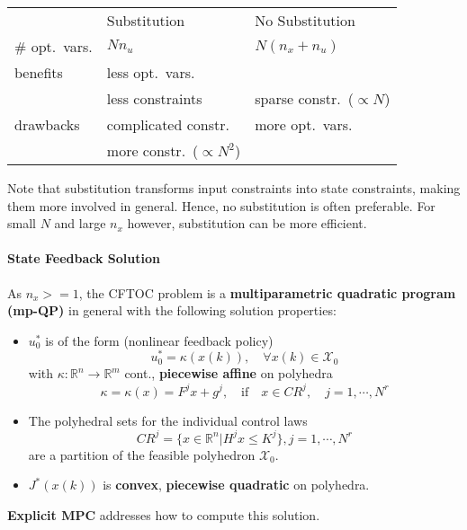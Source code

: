 \renewcommand{\arraystretch}{1.3}
\setlength{\oldtabcolsep}{\tabcolsep}\setlength\tabcolsep{6pt}
\begin{tabularx}{\linewidth}{@{}lll@{}}
                   & Substitution                  & No Substitution               \\
    \cmidrule{2-3}
    \# opt.\ vars. & $N n_u$                       & $N(n_x + n_u)$                \\
    benefits       & less opt.\ vars.              &                               \\
                   & less constraints              & sparse constr.\ ($\propto N$) \\
    drawbacks      & complicated constr.           & more opt.\ vars.              \\
                   & more constr.\ ($\propto N^2$) &                               %
\end{tabularx}
\renewcommand{\arraystretch}{1}
\setlength\tabcolsep{\oldtabcolsep}
Note that substitution transforms input constraints into state constraints, making them more involved in general. Hence, no substitution is often preferable. For small $N$ and large $n_x$ however, substitution can be more efficient.

\paragraph{State Feedback Solution}

As $n_x>=1$, the CFTOC problem is a \textbf{multiparametric quadratic program (mp-QP)} in general with the following solution properties:

\begin{itemize}
    \item $u_0^*$ is of the form (nonlinear feedback policy)
          \begin{equation*}
              u_0^*=\kappa(x(k)),\quad\forall x(k)\in\mathcal{X}_0
          \end{equation*}
          with $\kappa:\mathbb{R}^n \to \mathbb{R}^m$ cont., \textbf{piecewise affine} on polyhedra
          \begin{equation*}
              \kappa  =\kappa(x)=F^j x + g^j, \quad\mathrm{if}\quad x\in CR^j,\quad j=1,\cdots,N^r
          \end{equation*}
    \item The polyhedral sets for the individual control laws
          \begin{equation*}
              CR^j=\{x\in\mathbb{R}^n|H^j x\leq K^j\},j=1,\cdots,N^r
          \end{equation*}
          are a partition of the feasible polyhedron $\mathcal{X}_0$.
    \item $J^*(x(k))$ is \textbf{convex}, \textbf{piecewise quadratic} on polyhedra.
\end{itemize}
\newpar{}
\textbf{Explicit MPC} addresses how to compute this solution.

